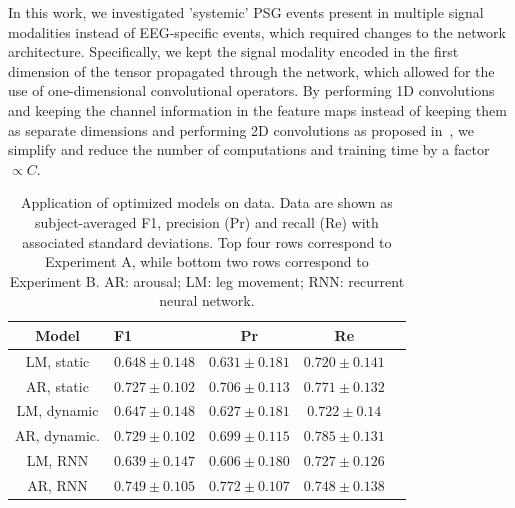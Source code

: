 In this work, we investigated 'systemic' \ac{PSG} events present in multiple signal modalities instead of EEG-specific events, which required changes to the network architecture. Specifically, we kept the signal modality encoded in the first dimension of the tensor propagated through the network, which allowed for the use of one-dimensional convolutional operators. By performing 1D convolutions and keeping the channel information in the feature maps instead of keeping them as separate dimensions and performing 2D convolutions as proposed in~\cite{Chambon2018b,Chambon2019}, we simplify and reduce the number of computations and training time by a factor $\propto C$. 
\begin{table}[tb]
    \centering
    \footnotesize
    \caption[MSEDv1 test performance]{Application of optimized models on \test{} data. Data are shown as subject-averaged F1, precision (Pr) and recall (Re) with associated standard deviations. Top four rows correspond to Experiment A, while bottom two rows correspond to Experiment B. AR: arousal; LM: leg movement; RNN: recurrent neural network.}
    \label{tab:paperiv-test_results}
    \begin{tabular}{clccc} \toprule
        Model & F1 & Pr & Re \\ \midrule
        LM, static & $0.648 \pm 0.148$ & $0.631 \pm 0.181$ & $0.720 \pm 0.141$ \\
        AR, static & $0.727 \pm 0.102$ & $0.706 \pm 0.113$ & $0.771 \pm 0.132$ \\
        LM, dynamic & $0.647 \pm 0.148$ & $0.627 \pm 0.181$ & $0.722 \pm 0.14$ \\
        AR, dynamic. & $0.729 \pm 0.102$ & $0.699 \pm 0.115$ & $0.785 \pm 0.131$ \\ \midrule
        LM, RNN & $0.639 \pm 0.147$ & $0.606 \pm 0.180$ & $0.727 \pm 0.126$ \\
        AR, RNN & $0.749 \pm 0.105$ & $0.772 \pm 0.107$ & $0.748 \pm 0.138$ \\ \bottomrule
    \end{tabular}
\end{table}
